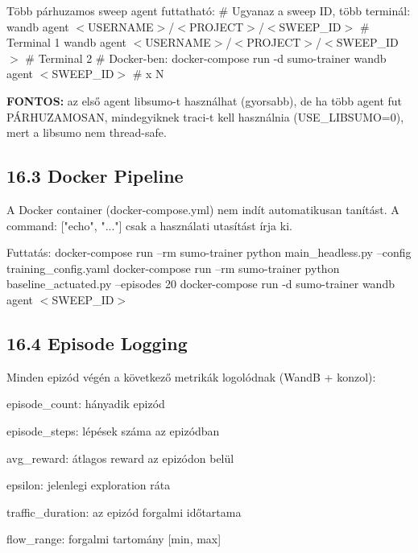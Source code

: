 \documentclass[11pt,a4paper]{article}
\begin{document}
Több párhuzamos sweep agent futtatható:
\# Ugyanaz a sweep ID, több terminál:
wandb agent $<$USERNAME$>$/$<$PROJECT$>$/$<$SWEEP\_ID$>$    \# Terminal 1
wandb agent $<$USERNAME$>$/$<$PROJECT$>$/$<$SWEEP\_ID$>$    \# Terminal 2
\# Docker-ben:
docker-compose run -d sumo-trainer wandb agent $<$SWEEP\_ID$>$  \# x N

\textbf{FONTOS:} az első agent libsumo-t használhat (gyorsabb), de ha több
agent fut PÁRHUZAMOSAN, mindegyiknek traci-t kell használnia
(USE\_LIBSUMO=0), mert a libsumo nem thread-safe.

\subsection*{16.3 Docker Pipeline}
A Docker container (docker-compose.yml) nem indít automatikusan tanítást.
A command: ["echo", "..."] csak a használati utasítást írja ki.

Futtatás:
docker-compose run --rm sumo-trainer python main\_headless.py --config training\_config.yaml
docker-compose run --rm sumo-trainer python baseline\_actuated.py --episodes 20
docker-compose run -d sumo-trainer wandb agent $<$SWEEP\_ID$>$

\subsection*{16.4 Episode Logging}
Minden epizód végén a következő metrikák logolódnak (WandB + konzol):
\par\noindent\hspace*{1em}\textbullet{} episode\_count: hányadik epizód
\par\noindent\hspace*{1em}\textbullet{} episode\_steps: lépések száma az epizódban
\par\noindent\hspace*{1em}\textbullet{} avg\_reward: átlagos reward az epizódon belül
\par\noindent\hspace*{1em}\textbullet{} epsilon: jelenlegi exploration ráta
\par\noindent\hspace*{1em}\textbullet{} traffic\_duration: az epizód forgalmi időtartama
\par\noindent\hspace*{1em}\textbullet{} flow\_range: forgalmi tartomány [min, max]
\end{document}
